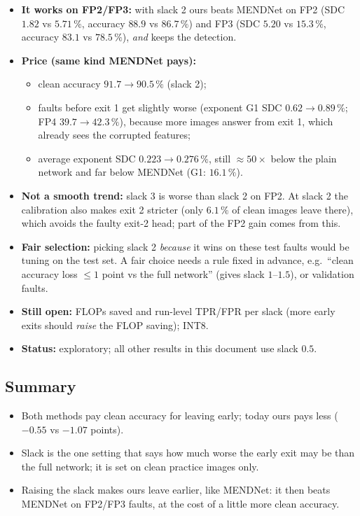 \documentclass[10pt,a4paper]{article}
\begin{document}
\begin{itemize}
  \item \textbf{It works on FP2/FP3:} with slack 2 ours beats MENDNet on FP2 (SDC $1.82$ vs $5.71\,\%$, accuracy
        $88.9$ vs $86.7\,\%$) and FP3 (SDC $5.20$ vs $15.3\,\%$, accuracy $83.1$ vs $78.5\,\%$), \emph{and} keeps
        the detection.
  \item \textbf{Price (same kind MENDNet pays):}
  \begin{itemize}
    \item clean accuracy $91.7 \to 90.5\,\%$ (slack 2);
    \item faults before exit 1 get slightly worse (exponent G1 SDC $0.62 \to 0.89\,\%$; FP4 $39.7 \to 42.3\,\%$),
          because more images answer from exit 1, which already sees the corrupted features;
    \item average exponent SDC $0.223 \to 0.276\,\%$, still $\approx 50\times$ below the plain network and far below
          MENDNet (G1: $16.1\,\%$).
  \end{itemize}
  \item \textbf{Not a smooth trend:} slack 3 is worse than slack 2 on FP2. At slack 2 the calibration also makes
        exit 2 stricter (only $6.1\,\%$ of clean images leave there), which avoids the faulty exit-2 head; part of
        the FP2 gain comes from this.
  \item \textbf{Fair selection:} picking slack 2 \emph{because} it wins on these test faults would be tuning on the
        test set. A fair choice needs a rule fixed in advance, e.g.\ ``clean accuracy loss $\le 1$ point vs the full
        network'' (gives slack $1$--$1.5$), or validation faults.
  \item \textbf{Still open:} FLOPs saved and run-level TPR/FPR per slack (more early exits should \emph{raise} the
        FLOP saving); INT8.
  \item \textbf{Status:} exploratory; all other results in this document use slack $0.5$.
\end{itemize}

\subsection*{Summary}

\begin{itemize}
  \item Both methods pay clean accuracy for leaving early; today ours pays less ($-0.55$ vs $-1.07$ points).
  \item Slack is the one setting that says how much worse the early exit may be than the full network; it is set on
        clean practice images only.
  \item Raising the slack makes ours leave earlier, like MENDNet: it then beats MENDNet on FP2/FP3 faults, at the
        cost of a little more clean accuracy.
\end{itemize}
\end{document}
